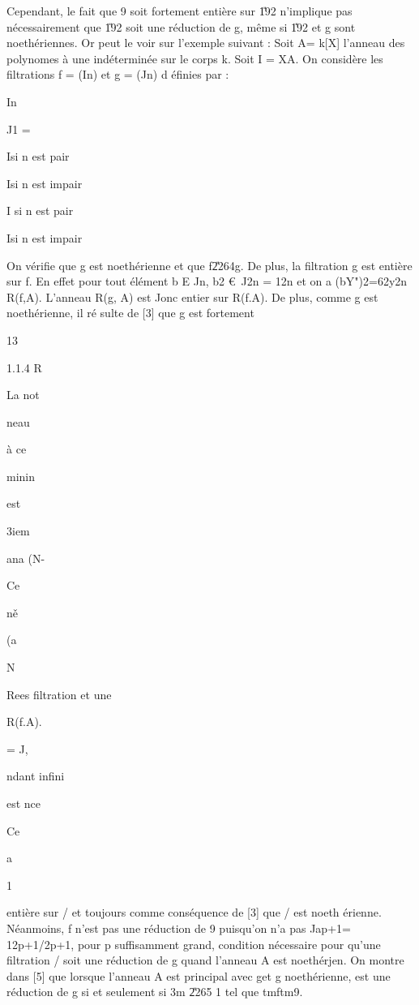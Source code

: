 \documentclass[11pt, twoside]{article}
\begin{document}
Cependant, le fait que 9 soit fortement enti\`{e}re sur \U{192} n'implique
pas n\'{e}cessairement que \U{192} soit une r\'{e}duction de g, m\^{e}me si 
\U{192} et g sont noeth\'{e}riennes. Or peut le voir sur l'exemple suivant :
Soit A= k[X] l'anneau des polynomes \`{a} une ind\'{e}termin\'{e}e sur le
corps k. Soit I = XA. On consid\`{e}re les filtrations f = (In) et g = (Jn) d%
\'{e}finies par :

In

J1 =

Isi n est pair

Isi n est impair

I si n est pair

Isi n est impair

On v\'{e}rifie que g est noeth\'{e}rienne et que f\U{2264}g. De plus, la
filtration g est enti\`{e}re sur f. En effet pour tout \'{e}l\'{e}ment b E
Jn, b2 \euro\ J2n = 12n et on a (bY")2=62y2n R(f,A). L'anneau R(g, A) est
Jonc entier sur R(f.A). De plus, comme g est noeth\'{e}rienne, il r\'{e}%
sulte de [3] que g est fortement

13

1.1.4 R

La not

neau

\`{a} ce

minin

est

3iem

ana (N-

Ce

n\v{e}

(a

N

\bigskip 

Rees filtration et une

R(f.A).

= J,

ndant infini

est nce

Ce

a

1

enti\`{e}re sur / et toujours comme cons\'{e}quence de [3] que / est noeth%
\'{e}rienne. N\'{e}anmoins, f n'est pas une r\'{e}duction de 9 puisqu'on n'a
pas Jap+1= 12p+1/2p+1, pour p suffisamment grand, condition n\'{e}cessaire
pour qu'une filtration / soit une r\'{e}duction de g quand l'anneau A est
noeth\'{e}rjen. On montre dans [5] que lorsque l'anneau A est principal avec
get g noeth\'{e}rienne, est une r\'{e}duction de g si et seulement si 3m 
\U{2265} 1 tel que tmftm9.
\end{document}

